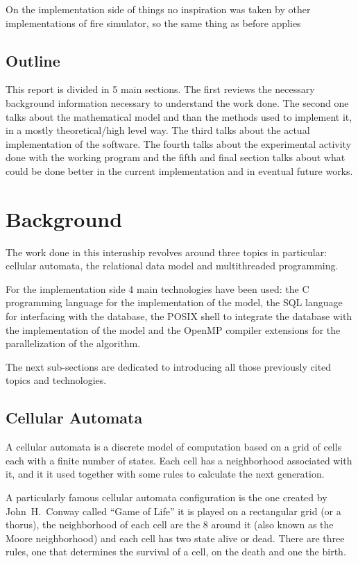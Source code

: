 \documentclass[Lau]{sapthesis} %
\let\oldsection\section
\def\subsection{\oldsection}
\def\section{\chapter}
\begin{document}
On the implementation side of things no inspiration was taken by other
implementations of fire simulator, so the same thing as before applies

\subsection{Outline}

This report is divided in 5 main sections. The first reviews the necessary
background information necessary to understand the work done. The second one
talks about the mathematical model and than the methods used to implement it, in
a mostly theoretical/high level way. The third talks about the actual
implementation of the software. The fourth talks about the experimental activity
done with the working program and the fifth and final section talks about what
could be done better in the current implementation and in eventual future works.

\section{Background}%

The work done in this internship revolves around three topics in particular:
cellular automata, the relational data model \cite{codd} and multithreaded
programming.

For the implementation side 4 main technologies have been used: the C
programming language for the implementation of the model, the SQL language for
interfacing with the database, the POSIX shell to integrate the database with
the implementation of the model and the OpenMP compiler extensions for the
parallelization of the algorithm.

The next sub-sections are dedicated to introducing all those previously cited
topics and technologies.

\subsection{Cellular Automata}

A cellular automata is a discrete model of computation based on a grid of cells
each with a finite number of states. Each cell has a neighborhood associated
with it, and it it used together with some rules to calculate the next
generation.

A particularly famous cellular automata configuration is the one created by
John~H.~Conway called ``Game of Life'' \cite{gol} it is played on a rectangular
grid (or a thorus), the neighborhood of each cell are the 8 around it (also
known as the Moore neighborhood) and each cell has two state alive or dead.
There are three rules, one that determines the survival of a cell, on the death
and one the birth.
\end{document}
